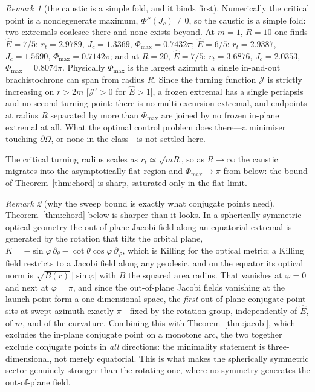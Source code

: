 \documentclass[12pt]{iopart}
\newcommand{\Ehat}{\hat E}
\theoremstyle{plain}
\theoremstyle{definition}
\theoremstyle{plain}
\theoremstyle{remark}
\newtheorem*{remark}{Remark}
\begin{document}
\begin{remark}[the caustic is a simple fold, and it binds first]\label{rem:caustic-num}
Numerically the critical point is a nondegenerate maximum, $\Phi''(J_c)\neq0$, so the
caustic is a simple fold: two extremals coalesce there and none exists beyond. At
$m=1$, $R=10$ one finds $\Ehat=7/5$: $r_t=2.9789$, $J_c=1.3369$, $\Phi_{\max}=0.7432\pi$;
$\Ehat=6/5$: $r_t=2.9387$, $J_c=1.5690$, $\Phi_{\max}=0.7142\pi$; and at $R=20$,
$\Ehat=7/5$: $r_t=3.6876$, $J_c=2.0353$, $\Phi_{\max}=0.8074\pi$. Physically
$\Phi_{\max}$ is the largest azimuth a single in-and-out brachistochrone can span from
radius $R$. Since the turning function $\mathcal J$ is strictly increasing on $r>2m$
[$\mathcal J'>0$ for $\Ehat>1$], a frozen extremal has a single periapsis and no second
turning point: there is no multi-excursion extremal, and endpoints at radius $R$ separated
by more than $\Phi_{\max}$ are joined by no frozen in-plane extremal at all. What the optimal
control problem does there---a minimiser touching $\partial\Omega$, or none in the class---is
not settled here.

The critical turning radius scales as $r_t\simeq\sqrt{mR}$, so as $R\to\infty$ the caustic
migrates into the asymptotically flat region and $\Phi_{\max}\to\pi$ from below: the bound
of Theorem~\ref{thm:chord} is sharp, saturated only in the flat limit.
\end{remark}

\begin{remark}[why the sweep bound is exactly what conjugate points need]
\label{rmk:sweep-jacobi}
Theorem~\ref{thm:chord} below is sharper than it looks. In a spherically
symmetric optical geometry the out-of-plane Jacobi field along an equatorial
extremal is generated by the rotation that tilts the orbital plane,
$K=-\sin\varphi\,\partial_\theta-\cot\theta\cos\varphi\,\partial_\varphi$, which
is Killing for the optical metric; a Killing field restricts to a Jacobi field
along any geodesic, and on the equator its optical norm is
$\sqrt{B(r)}\,|\sin\varphi|$ with $B$ the squared area radius. That vanishes at
$\varphi=0$ and next at $\varphi=\pi$, and since the out-of-plane Jacobi fields
vanishing at the launch point form a one-dimensional space, the \emph{first}
out-of-plane conjugate point sits at swept azimuth exactly $\pi$---fixed by the
rotation group, independently of $\Ehat$, of $m$, and of the curvature. Combining
this with Theorem~\ref{thm:jacobi}, which excludes the in-plane conjugate point
on a monotone arc, the two together exclude conjugate points in \emph{all}
directions: the minimality statement is three-dimensional, not merely equatorial.
This is what makes the spherically symmetric sector genuinely stronger than the
rotating one, where no symmetry generates the out-of-plane field.
\end{remark}
\end{document}
